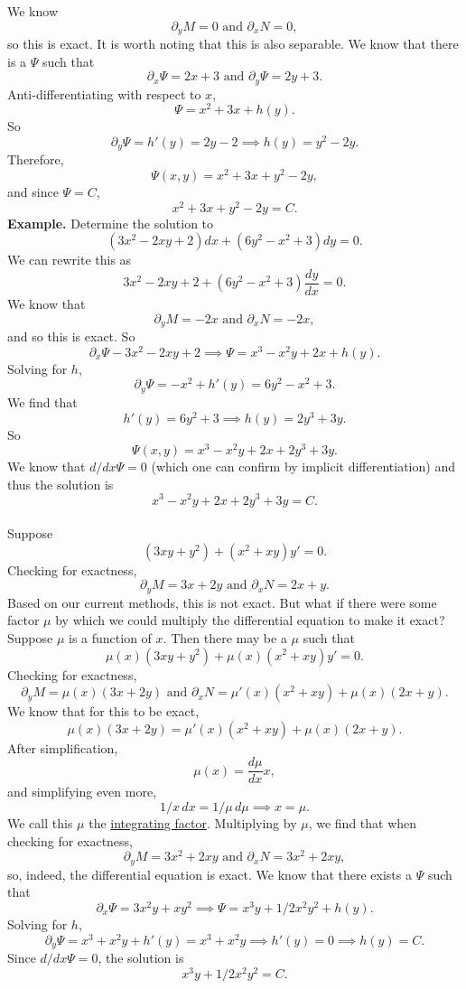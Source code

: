 \documentclass[11pt, oneside]{article}   	%
\begin{document}
We know
$$
\partial _y M = 0 \textrm{ and } \partial _x N = 0,
$$
so this is exact. It is worth noting that this is also separable. We know that there is a $\Psi$ such that 
$$
\partial_x \Psi = 2x+3\textrm{ and } \partial_y \Psi = 2y+3.
$$
Anti-differentiating with respect to $x$, 
$$
\Psi = x^2 + 3x + h(y).
$$
So
$$
\partial_y \Psi = h' (y)=2y-2\implies h(y) = y^2 - 2y.
$$
Therefore, 
$$
\Psi(x,y) = x^2 + 3x + y^2 - 2y,
$$
and since $\Psi=C$, 
$$
\boxed{x^2 + 3x + y^2 - 2y = C.}
$$
\textbf{Example.} Determine the solution to 
$$
(3x^2  - 2xy + 2)dx + (6y^2 - x^2+3)dy = 0.
$$
We can rewrite this as
$$
3x^2  - 2xy + 2+ (6y^2 - x^2+3)\frac{dy}{dx} = 0.
$$
We know that 
$$
\partial _y M = -2x \textrm{ and } \partial _x N = -2x,
$$
and so this is exact. So 
$$
\partial _x \Psi - 3x^2 - 2xy + 2\implies \Psi = x^3 - x^2y + 2x + h(y).
$$
Solving for $h$,
$$
\partial_y\Psi = -x^2 + h'(y) = 6y^2 - x^2 + 3.
$$
We find that 
$$
h'(y) = 6y^2 + 3\implies h(y) = 2y^3 + 3y.
$$
So 
$$
\Psi(x,y) = x^3 - x^2y + 2x + 2y^3 + 3y.
$$
We know that $d/dx\Psi = 0 $ (which one can confirm by implicit differentiation) and thus the solution is
$$
\boxed{x^3 - x^2y + 2x + 2y^3 + 3y = C.}
$$
\textrm{}\\ Suppose 
$$
(3xy + y^2) + (x^2 + xy)y' = 0.
$$
Checking for exactness,
$$
\partial_y M =  3x + 2y \textrm{ and }\partial_x  N= 2x + y.
$$
Based on our current methods, this is not exact. But what if there were some factor $\mu$ by which we could multiply the differential equation to make it exact? Suppose $\mu $ is a function of $x$. Then there may be a $\mu $ such that
$$
\mu(x) (3xy + y^2) + \mu(x)(x^2 + xy)y' = 0.
$$
Checking for exactness,
$$
\partial_y M =  \mu(x)(3x + 2y) \textrm{ and }\partial_x  N= \mu'(x)(x^2 + xy) + \mu(x)(2x + y).
$$
We know that for this to be exact, 
$$
\mu(x)(3x + 2y) = \mu'(x)(x^2 + xy) + \mu(x)(2x + y).
$$
After simplification,
$$
\mu(x) =  \frac{d\mu}{dx} x, 
$$
and simplifying even more,
$$
1/x \,dx = 1/\mu\, d\mu\implies x =\mu.
$$
We call this $\mu$ the \underline{integrating factor}. Multiplying by $\mu$, we find that when checking for exactness,
$$
\partial_y M =  3x^2 + 2xy \textrm{ and }\partial_x  N= 3x^2 + 2xy,
$$
so, indeed, the differential equation is exact. We know that there exists a $\Psi$ such that
$$
\partial_x \Psi  = 3x^2y + xy^2\implies \Psi = x^3y + 1/2x^2y^2 + h(y).
$$
Solving for $h$,
$$
\partial_y \Psi = x^3 + x^2y + h'(y) = x^3 + x^2y \implies h'(y) = 0 \implies h(y) = C.
$$
Since $d/dx \Psi = 0$, the solution is 
$$
x^3y + 1/2x^2y^2 = C.
$$
\end{document}
